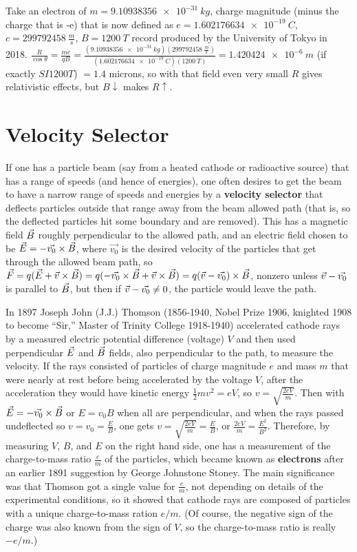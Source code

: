 Take an electron of $m = \SI{9.10938356e-31}{kg}$, charge magnitude (minus the charge that is -e) that is now defined as $e = \SI{1.602176634e-19}{C}$, $c = \SI{299792458}{\frac{m}{s}}$, $B = \SI{1200}{T}$ record produced by the University of Tokyo in 2018. $\frac{R}{\cos\theta} = \frac{mc}{qB} = \frac{(\SI{9.10938356e-31}{kg})(\SI{299792458}{\frac{m}{s}})}{(\SI{1.602176634e-19}{C})(\SI{1200}{T})} = \SI{1.420424e-6}{m}$ (if exactly $SI{1200}{T}$) $= 1.4$ microns, so with that field even very small $R$ gives relativistic effects, but $B\downarrow$ makes $R\uparrow$.

\section{Velocity Selector}

If one has a particle beam (say from a heated cathode or radioactive source) that has a range of speeds (and hence of energies), one often desires to get the beam to have a narrow range of speeds and energies by a \textbf{velocity selector} that deflects particles outside that range away from the beam allowed path (that is, so the deflected particles hit some boundary and are removed). This has a magnetic field $\vec{B}$ roughly perpendicular to the allowed path, and an electric field chosen to be $\vec{E} = -\vec{v_0} \times \vec{B}$, where $\vec{v_0}$ is the desired velocity of the particles that get through the allowed beam path, so $\vec{F} = q(\vec{E} + \vec{v} \times \vec{B}) = q(-\vec{v_0}\times\vec{B} + \vec{v} \times \vec{B}) = q(\vec{v} - \vec{v_0}) \times \vec{B}$, nonzero unless $\vec{v} - \vec{v_0}$ is parallel to $\vec{B}$, but then if $\vec{v} - \vec{v_0} \neq 0$, the particle would leave the path.

In 1897 Joseph John (J.J.) Thomson (1856-1940, Nobel Prize 1906, knighted 1908 to become ``Sir,'' Master of Trinity College 1918-1940) accelerated cathode rays by a measured electric potential difference (voltage) $V$ and then used perpendicular $\vec{E}$ and $\vec{B}$ fields, also perpendicular to the path, to measure the velocity. If the rays consisted of particles of charge magnitude $e$ and mass $m$ that were nearly at rest before being accelerated by the voltage $V$, after the acceleration they would have kinetic energy $\frac{1}{2}mv^2 = eV$, so $v = \sqrt{\frac{2eV}{m}}$. Then with $\vec{E} = -\vec{v_0} \times \vec{B}$ or $E = v_0B$ when all are perpendicular, and when the rays passed undeflected so $v = v_{0} = \frac{E}{B}$, one gets $v = \sqrt{\frac{2eV}{m}} = \frac{E}{B}$, or $\frac{2eV}{m} = \frac{E^2}{B^2}$. Therefore, by measuring $V$, $B$, and $E$ on the right hand side, one has a measurement of the charge-to-mass ratio $\frac{e}{m}$ of the particles, which became known as \textbf{electrons} after an earlier 1891 suggestion by George Johnstone Stoney. The main significance was that Thomson got a single value for $\frac{e}{m}$, not depending on details of the experimental conditions, so it showed that cathode rays are composed of particles with a unique charge-to-mass ration $e/m$. (Of course, the negative sign of the charge was also known from the sign of $V$, so the charge-to-mass ratio is really $-e/m$.)

